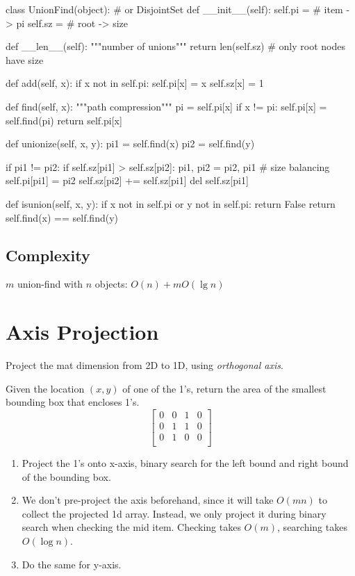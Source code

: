 \begin{python}
class UnionFind(object):  # or DisjointSet
  def __init__(self):
    self.pi = {}  # item -> pi
    self.sz = {}  # root -> size

  def __len__(self):
    """number of unions"""
    return len(self.sz)  # only root nodes have size

  def add(self, x):
    if x not in self.pi:
      self.pi[x] = x
      self.sz[x] = 1

  def find(self, x):
    """path compression"""
    pi = self.pi[x]
    if x != pi:
      self.pi[x] = self.find(pi)
    return self.pi[x]

  def unionize(self, x, y):
    pi1 = self.find(x)
    pi2 = self.find(y)

    if pi1 != pi2:
      if self.sz[pi1] > self.sz[pi2]:
        pi1, pi2 = pi2, pi1
        # size balancing
      self.pi[pi1] = pi2
      self.sz[pi2] += self.sz[pi1]
      del self.sz[pi1]

  def isunion(self, x, y):
    if x not in self.pi or y not in self.pi:
      return False
    return self.find(x) == self.find(y)
\end{python}

\subsection{Complexity}
$m$ union-find with $n$ objects: $O(n)+m O(\lg n)$

\section{Axis Projection}
Project the mat dimension from 2D to 1D, using \textit{orthogonal axis}.

 Given the location $(x, y)$ of one of the 1's, return the area of the smallest bounding box that encloses 1's.
$$
\begin{bmatrix}
0& 0& 1& 0 \\
0& 1& 1& 0 \\
0& 1& 0& 0 \\
\end{bmatrix}
$$

\begin{enumerate}
\item Project the 1's onto x-axis, binary search for the left bound and right bound of the bounding box. 
\item We don't pre-project the axis beforehand, since it will take $O(mn)$ to collect the projected 1d array. Instead, we only project it during binary search when checking the mid item. Checking takes $O(m)$, searching takes $O(\log n)$. 
\item Do the same for y-axis.
\end{enumerate}

